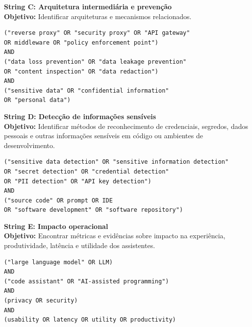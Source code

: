 \vspace{0.3cm}
\noindent\textbf{String C: Arquitetura intermediária e prevenção} \\
\textbf{Objetivo:} Identificar arquiteturas e mecanismos relacionados. \\
\begin{verbatim}
("reverse proxy" OR "security proxy" OR "API gateway"
OR middleware OR "policy enforcement point")
AND
("data loss prevention" OR "data leakage prevention"
OR "content inspection" OR "data redaction")
AND
("sensitive data" OR "confidential information"
OR "personal data")
\end{verbatim}

\vspace{0.3cm}
\noindent\textbf{String D: Detecção de informações sensíveis} \\
\textbf{Objetivo:} Identificar métodos de reconhecimento de credenciais, segredos, dados pessoais e outras informações sensíveis em código ou ambientes de desenvolvimento. \\
\begin{verbatim}
("sensitive data detection" OR "sensitive information detection"
OR "secret detection" OR "credential detection"
OR "PII detection" OR "API key detection")
AND
("source code" OR prompt OR IDE
OR "software development" OR "software repository")
\end{verbatim}

\vspace{0.3cm}
\noindent\textbf{String E: Impacto operacional} \\
\textbf{Objetivo:} Encontrar métricas e evidências sobre impacto na experiência, produtividade, latência e utilidade dos assistentes. \\
\begin{verbatim}
("large language model" OR LLM)
AND
("code assistant" OR "AI-assisted programming")
AND
(privacy OR security)
AND
(usability OR latency OR utility OR productivity)
\end{verbatim}